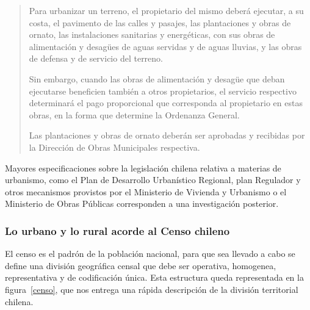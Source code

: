 \begin{quote}
Para urbanizar un terreno, el           
propietario del mismo deberá ejecutar, a su costa, el      
pavimento de las calles y pasajes, las plantaciones y      
obras de ornato, las instalaciones sanitarias y            
energéticas, con sus obras de alimentación y desagües de 
aguas servidas y de aguas lluvias, y las obras de 
defensa y de servicio del terreno.

    Sin embargo, cuando las obras de alimentación y 
    desagüe que deban ejecutarse beneficien también a otros 
    propietarios, el servicio respectivo determinará el pago 
    proporcional que corresponda al propietario en estas 
    obras, en la forma que determine la Ordenanza General.
    
        Las plantaciones y obras de ornato deberán ser         
        aprobadas y recibidas por la Dirección de Obras            
        Municipales respectiva.                                    
\end{quote}

Mayores especificaciones sobre la legislación chilena relativa a materias de urbanismo, como el Plan
de Desarrollo Urbanístico Regional, plan Regulador y otros mecanismos provistos por el Ministerio de
Vivienda y Urbanismo o el Ministerio de Obras Públicas corresponden a una investigación posterior.

\subsubsection{Lo urbano y lo rural acorde al Censo chileno}

El censo es el padrón de la población nacional, para que sea llevado a cabo se define una división
geográfica censal que debe ser operativa, homogenea, representativa y de codificación única. Esta
estructura queda representada en la figura~\ref{censo}, que nos entrega una rápida descripción de la
división territorial chilena. 

